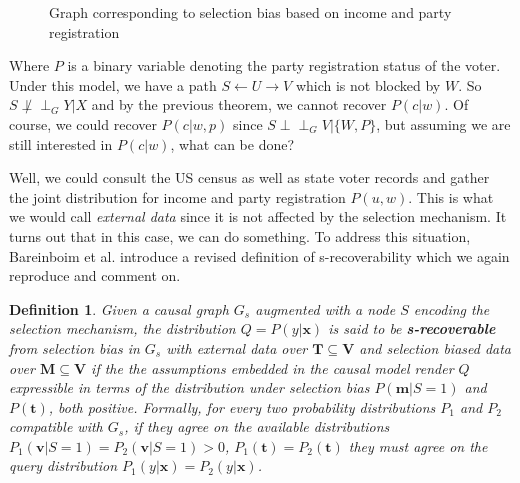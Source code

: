 \documentclass[12pt,twoside]{reedthesis}
\newtheorem{definition}{Definition}[section]
\theoremstyle{definition}
\newcommand{\dsep}{\perp \!\!\!\perp}
\begin{document}
\begin{figure}
\begin{center}
\end{center}
\caption{Graph corresponding to selection bias based on income and party registration} \label{fig:2.1}
\end{figure}

Where $P$ is a binary variable denoting the party registration status of the voter. Under this model, we have a path $S \leftarrow U \rightarrow V$ which is not blocked by $W$. So $S \not \dsep_G Y | X$ and by the previous theorem, we cannot recover $P(c|w)$. Of course, we could recover $P(c | w, p)$ since $S \dsep_G V | \{W,P\}$, but assuming we are still interested in $P(c|w)$, what can be done?  

Well, we could consult the US census as well as state voter records and gather the  joint distribution for income and party registration $P(u, w)$. This is what we would call \emph{external data} since it is not affected by the selection mechanism. It turns out that in this case, we can do something. To address this situation, Bareinboim et al.  introduce a revised definition  of s-recoverability which we again reproduce and comment on. 
 
\begin{definition}
Given a causal graph $G_s$ augmented with a node $S$ encoding the selection mechanism, the distribution $Q = P(y | \mathbf{x})$ is said to be \textbf{s-recoverable} from selection bias in $G_s$ with external data over $\mathbf{T} \subseteq \mathbf{V}$ and selection biased data over $\mathbf{M} \subseteq \mathbf{V}$ if the the assumptions embedded in the causal model render $Q$ expressible in terms of the distribution under selection bias $P(\mathbf{m} | S = 1)$ and $P(\mathbf{t})$, both positive. Formally, for every two probability distributions $P_1$ and $P_2$ compatible with $G_s$, if they agree on the available distributions $P_1(\mathbf{v} | S = 1) = P_2(\mathbf{v} | S = 1) > 0$, $P_1(\mathbf{t}) = P_2(\mathbf{t})$ they must agree on the query distribution $P_1(y | \mathbf{x}) = P_2(y | \mathbf{x})$.
\end{definition}
\end{document}
